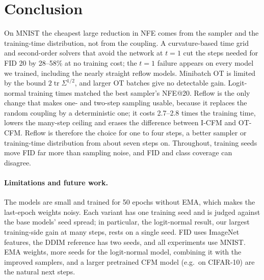 \section{Conclusion}
On MNIST the cheapest large reduction in NFE comes from the sampler and the training-time distribution, not from the coupling. A curvature-based time grid and second-order solvers that avoid the network at $t=1$ cut the steps needed for FID 20 by 28--58\% at no training cost; the $t=1$ failure appears on every model we trained, including the nearly straight reflow models. Minibatch OT is limited by the bound $2\operatorname{tr}\Sigma^{1/2}$, and larger OT batches give no detectable gain. Logit-normal training times matched the best sampler's NFE@20. Reflow is the only change that makes one- and two-step sampling usable, because it replaces the random coupling by a deterministic one; it costs 2.7--2.8 times the training time, lowers the many-step ceiling and erases the difference between I-CFM and OT-CFM. Reflow is therefore the choice for one to four steps, a better sampler or training-time distribution from about seven steps on. Throughout, training seeds move FID far more than sampling noise, and FID and class coverage can disagree.

\paragraph{Limitations and future work.} The models are small and trained for 50 epochs without EMA, which makes the last-epoch weights noisy. Each variant has one training seed and is judged against the base models' seed spread; in particular, the logit-normal result, our largest training-side gain at many steps, rests on a single seed. FID uses ImageNet features, the DDIM reference has two seeds, and all experiments use MNIST. EMA weights, more seeds for the logit-normal model, combining it with the improved samplers, and a larger pretrained CFM model (e.g.\ on CIFAR-10) are the natural next steps.
